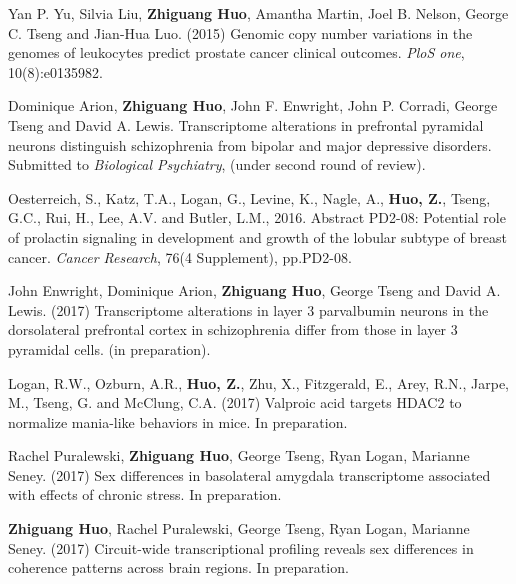 \documentclass[a4paper, 10pt]{article}
\begin{document}
\begin{thebibliography}{9}
Yan P. Yu, Silvia Liu, {\bf Zhiguang Huo}, Amantha Martin, Joel B. Nelson, George C. Tseng and Jian-Hua Luo. (2015) Genomic copy number variations in the genomes of leukocytes predict prostate cancer clinical outcomes. \emph{PloS one}, 10(8):e0135982.

    
Dominique Arion, {\bf Zhiguang Huo}, John F. Enwright, John P. Corradi, George Tseng and David A. Lewis.
Transcriptome alterations in prefrontal pyramidal neurons distinguish schizophrenia from bipolar and major depressive disorders.
Submitted to \emph{Biological Psychiatry}, (under second round of review).



Oesterreich, S., Katz, T.A., Logan, G., Levine, K., Nagle, A., {\bf Huo, Z.}, Tseng, G.C., Rui, H., Lee, A.V. and Butler, L.M., 2016. Abstract PD2-08: Potential role of prolactin signaling in development and growth of the lobular subtype of breast cancer. \emph{Cancer Research}, 76(4 Supplement), pp.PD2-08.

John Enwright,  Dominique Arion, {\bf Zhiguang Huo}, George Tseng and David A. Lewis. 
(2017) Transcriptome alterations in layer 3 parvalbumin neurons in the dorsolateral prefrontal cortex in schizophrenia differ from those in layer 3 pyramidal cells.
(in preparation).

 Logan, R.W., Ozburn, A.R., {\bf Huo, Z.}, Zhu, X., Fitzgerald, E., Arey, R.N., Jarpe, M., Tseng, G. and McClung, C.A. (2017)
Valproic acid targets HDAC2 to normalize mania-like behaviors in mice. In preparation.


  Rachel Puralewski, {\bf Zhiguang Huo}, George Tseng, Ryan Logan, Marianne Seney. (2017) Sex differences in basolateral amygdala transcriptome associated with effects of chronic stress. In preparation.

  {\bf Zhiguang Huo}, Rachel Puralewski, George Tseng, Ryan Logan, Marianne Seney. (2017) Circuit-wide transcriptional profiling reveals sex differences in coherence patterns across brain regions. In preparation.


\end{thebibliography}
\end{document}
